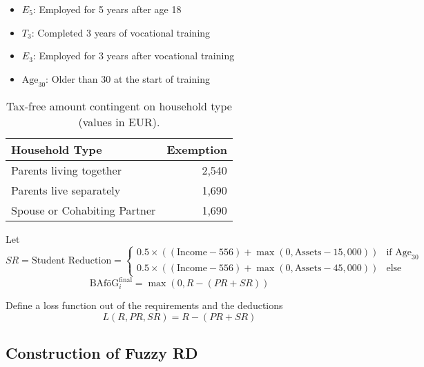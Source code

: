 \begin{itemize}
  \item \( E_5 \): Employed for 5 years after age 18
  \item \( T_3 \): Completed 3 years of vocational training
  \item \( E_3 \): Employed for 3 years after vocational training
  \item \( \text{Age}_{30} \): Older than 30 at the start of training
\end{itemize}

\begin{table}[H]
\small
\centering
  \begin{tabular}{lr}
  \hline
  Household Type & Exemption \\
  \hline
  Parents living together & 2,540 \\
  Parents live separately & 1,690 \\
  Spouse or Cohabiting Partner & 1,690 \\
  \hline
  \end{tabular}
\caption{Tax-free amount contingent on household type (values in EUR).} 
\end{table}

Let 
\[
SR = \text{Student Reduction} = 
\begin{cases} 
    0.5 \times \left( (\text{Income} - 556) + \max(0, \text{Assets} - 15,000)  \right) & \text{if Age}_{30} \\
    0.5 \times \left( (\text{Income} - 556) + \max(0, \text{Assets} - 45,000) \right) & \text{else}
\end{cases}
\]
\[
\text{BAföG}^\text{final}_{i} = \max(0, R - (PR + SR)) %
\]


Define a loss function out of the requirements and the deductions 
\begin{equation}
L(R, PR, SR) = R - (PR + SR)
\end{equation}


\subsection{Construction of Fuzzy RD}


